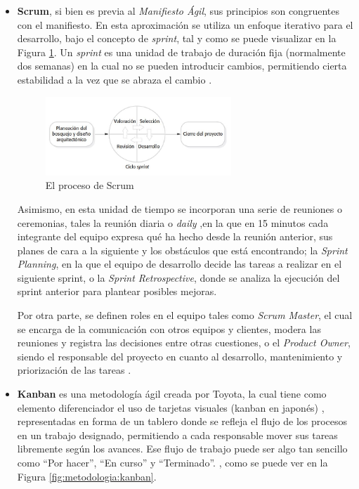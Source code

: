         \begin{itemize}
            \item \textbf{Scrum}, si bien es previa al \textit{Manifiesto Ágil}, sus principios son congruentes con el manifiesto. En esta aproximación se utiliza un enfoque iterativo para el desarrollo, bajo el concepto de \textit{sprint}, tal y como se puede visualizar en la Figura \ref{fig:metodologia:scrum}. Un \textit{sprint} es una unidad de trabajo de duración fija (normalmente dos semanas) en la cual no se pueden introducir cambios, permitiendo cierta estabilidad a la vez que se abraza el cambio \cite{pressman_software_2005}. 
    
            \begin{figure}[h]
                \centering
                \includegraphics[width=0.66\textwidth]{figures/scrum.JPG}
                \caption[El proceso de Scrum, extraído de \cite{sommerville_software_2011}]{El proceso de Scrum}
                \label{fig:metodologia:scrum}
            \end{figure}
            
            Asimismo, en esta unidad de tiempo se incorporan una serie de reuniones o ceremonias, tales la reunión diaria o \textit{daily} ,en la que en 15 minutos cada integrante del equipo expresa qué ha hecho desde la reunión anterior, sus planes de cara a la siguiente y los obstáculos que está encontrando; la \textit{Sprint Planning}, en la que el equipo de desarrollo decide las tareas a realizar en el siguiente sprint, o la \textit{Sprint Retrospective}, donde se analiza la ejecución del sprint anterior para plantear posibles mejoras. 
    
            Por otra parte, se definen roles en el equipo tales como \textit{Scrum Master}, el cual se encarga de la comunicación con otros equipos y clientes, modera las reuniones y registra las decisiones entre otras cuestiones, o el \textit{Product Owner}, siendo el responsable del proyecto en cuanto al desarrollo, mantenimiento y priorización de las tareas \cite{valtx_metodologias_2023}.
    
            \item \textbf{Kanban} es una metodología ágil creada por Toyota, la cual tiene como elemento diferenciador el uso de tarjetas visuales (kanban en japonés) \cite{pzt_metodologias_nodate}, representadas en forma de un tablero donde se refleja el flujo de los procesos en un trabajo designado, permitiendo a cada responsable mover sus tareas libremente según los avances. Ese flujo de trabajo puede ser algo tan sencillo como ``Por hacer'', ``En curso'' y  ``Terminado''.
            \cite{atlassian_que_nodate-1}, como se puede ver en la Figura \ref{fig:metodologia:kanban}.
    

\end{itemize}
